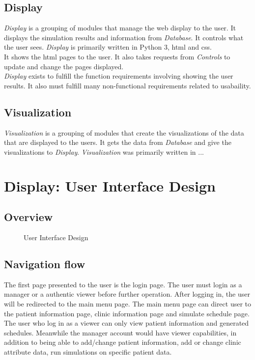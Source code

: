 \documentclass[12pt]{article}
\begin{document}
\subsection{Display}
\textit{Display} is a grouping of modules that manage the web display to the user. It displays the simulation results and information from \textit{Database}. It controls what the user sees. \textit{Display} is primarily written in Python 3, html and css. \\
It shows the html pages to the user. It also takes requests from \textit{Controls} to update and change the pages displayed. \\
\textit{Display} exists to fulfill the function requirements involving showing the user results. It also must fulfill many non-functional requirements related to usabaility. \\
\subsection{Visualization}
\textit{Visualization} is a grouping of modules that create
the visualizations of the data that are displayed to the users. 
It gets the data from \textit{Database} and give the visualizations to \textit{Display}. \textit{Visualization} was primarily written in ...

\section{Display: User Interface Design}
\subsection{Overview}


\begin{figure}[H]
	\centering
	\caption{User Interface Design}
\end{figure}

\subsection{Navigation flow}
The first page presented to the user is the login page. The user must login as a manager or a authentic viewer before further operation. After logging in, the user will be redirected to the main menu page. The main menu page can direct user to the patient information page, clinic information page and simulate schedule page. The user who log in as a viewer can only view patient information and generated schedules. Meanwhile the manager account would have viewer capabilities, in addition to being able to add/change patient information, add or change clinic attribute data, run simulations on specific patient data.
\end{document}

